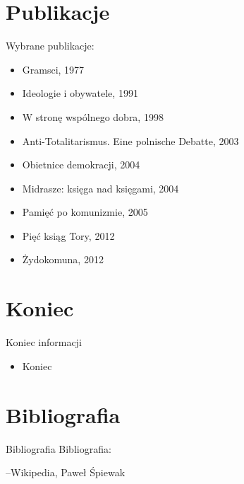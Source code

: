 \documentclass{beamer}
\begin{document}
\section{Publikacje}
\begin{frame}{Wybrane publikacje:}
\begin {itemize}
\pause
\item Gramsci, 1977 \pause
\item Ideologie i obywatele, 1991 \pause
\item W stronę wspólnego dobra, 1998 \pause
\item Anti-Totalitarismus. Eine polnische Debatte, 2003 \pause
\item Obietnice demokracji, 2004 \pause
\item Midrasze: księga nad księgami, 2004 \pause
\item Pamięć po komunizmie, 2005 \pause
\item Pięć ksiąg Tory, 2012 \pause
\item Żydokomuna, 2012 
\end {itemize} 
\end {frame}

\section{Koniec}
\begin{frame}{Koniec informacji}
\begin {itemize}
\item Koniec
\end {itemize}
\end {frame}

\section{Bibliografia}
\begin{frame}{Bibliografia}
Bibliografia:
\begin{thebibliography}{9}
--Wikipedia, Paweł Śpiewak
\end{thebibliography}
\end{frame}
\end{document}
